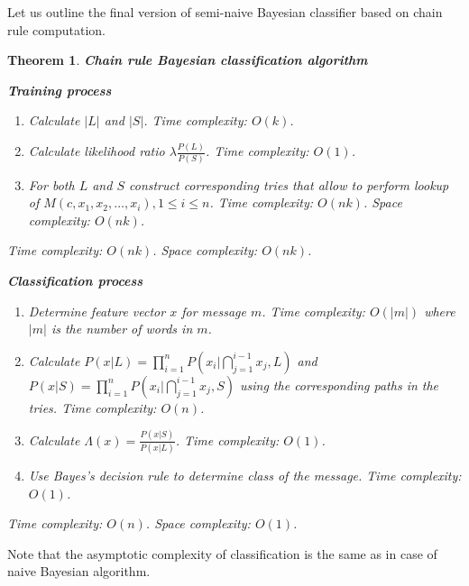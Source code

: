 \documentclass[12pt]{report}
\newtheorem{theorem}{Theorem}[section]
\begin{document}
Let us outline the final version of semi-naive Bayesian classifier based on chain rule computation.

\begin{theorem}
	\textbf{Chain rule Bayesian classification algorithm}
	
	\textbf{Training process}
	
	\begin{enumerate}
		\item Calculate $|L|$ and $|S|$. Time complexity: $O(k)$.
		\item Calculate likelihood ratio $\lambda \frac{P(L)}{P(S)}$. Time complexity: $O(1)$.
		\item For both $L$ and $S$ construct corresponding tries that allow to perform lookup of $M(c, x_1, x_2, \dots, x_i), 1 \le i \le n$. Time complexity: $O(nk)$. Space complexity: $O(nk)$.
	\end{enumerate}
	
	Time complexity: $O(nk)$. Space complexity: $O(nk)$.
	
	\textbf{Classification process}
	
	\begin{enumerate}
		\item Determine feature vector $x$ for message $m$. Time complexity: $O(|m|)$ where $|m|$ is the number of words in $m$.
		\item Calculate $P(x | L) = \prod_{i=1}^{n} P(x_i | \bigcap_{j = 1}^{i - 1} x_j, L)$ and $P(x | S) = \prod_{i=1}^{n} P(x_i | \bigcap_{j = 1}^{i - 1} x_j, S)$ using the corresponding paths in the tries. Time complexity: $O(n)$.
		\item Calculate $\Lambda(x) = \frac{P(x | S)}{P(x | L)}$. Time complexity: $O(1)$.
		\item Use Bayes's decision rule to determine class of the message. Time complexity: $O(1)$.
	\end{enumerate}
	
	Time complexity: $O(n)$. Space complexity: $O(1)$.
\end{theorem}

Note that the asymptotic complexity of classification is the same as in case of naive Bayesian algorithm.
\end{document}
